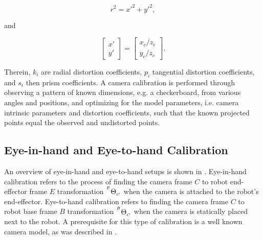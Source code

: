 \begin{equation}
    r^2 = x'^2 + y'^2,
\end{equation}

and

\begin{equation}
    \begin{bmatrix}
        x' \\
        y'
    \end{bmatrix} = \begin{bmatrix}
        x_c/z_c \\
        y_c/z_c
    \end{bmatrix}.
\end{equation}

Therein, $k_i$ are radial distortion coefficients, $p_i$ tangential distortion coefficients, and $s_i$ then prism coefficients. A camera calibration is performed through observing a pattern of known dimensions, e.g. a checkerboard, from various angles and positions, and optimizing for the model parameters, i.e. camera intrinsic parameters and distortion coefficients, such that the known projected points equal the observed and undistorted points.

\subsection{Eye-in-hand and Eye-to-hand Calibration}
\label{in:sec:eye_in_to_hand_calibration}
An overview of eye-in-hand and eye-to-hand setups is shown in . Eye-in-hand calibration refers to the process of finding the camera frame $C$ to robot end-effector frame $E$ transformation ${}^{^E}\Theta_{_C}$ when the camera is attached to the robot's end-effector. Eye-to-hand calibration refers to finding the camera frame $C$ to robot base frame $B$ transformation ${}^{^B}\Theta_{_C}$ when the camera is statically placed next to the robot. A prerequisite for this type of calibration is a well known camera model, as was described in .

